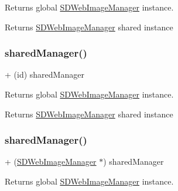 Returns global \mbox{\hyperlink{interface_s_d_web_image_manager}{S\+D\+Web\+Image\+Manager}} instance.

\begin{DoxyReturn}{Returns}
\mbox{\hyperlink{interface_s_d_web_image_manager}{S\+D\+Web\+Image\+Manager}} shared instance 
\end{DoxyReturn}
\mbox{\label{interface_s_d_web_image_manager_a03e60850e7f6da2aa38b7db870c93626}} 
\subsubsection{\texorpdfstring{shared\+Manager()}{sharedManager()}\hspace{0.1cm}{\footnotesize\ttfamily [2/3]}}
{\footnotesize\ttfamily + (id) shared\+Manager \begin{DoxyParamCaption}{ }\end{DoxyParamCaption}}

Returns global \mbox{\hyperlink{interface_s_d_web_image_manager}{S\+D\+Web\+Image\+Manager}} instance.

\begin{DoxyReturn}{Returns}
\mbox{\hyperlink{interface_s_d_web_image_manager}{S\+D\+Web\+Image\+Manager}} shared instance 
\end{DoxyReturn}
\mbox{\label{interface_s_d_web_image_manager_a5b1936f0aaad5bc7b6cb470f46ac173f}} 
\subsubsection{\texorpdfstring{shared\+Manager()}{sharedManager()}\hspace{0.1cm}{\footnotesize\ttfamily [3/3]}}
{\footnotesize\ttfamily + (\mbox{\hyperlink{interface_s_d_web_image_manager}{S\+D\+Web\+Image\+Manager}} $\ast$) shared\+Manager \begin{DoxyParamCaption}{ }\end{DoxyParamCaption}}

Returns global \mbox{\hyperlink{interface_s_d_web_image_manager}{S\+D\+Web\+Image\+Manager}} instance.

